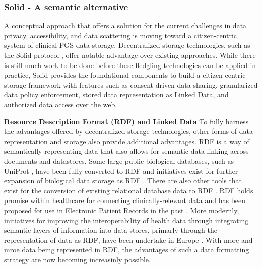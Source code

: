 \documentclass[runningheads]{llncs}
\begin{document}
\subsubsection{Solid - A semantic alternative} 
A conceptual approach that offers a solution for the current challenges in data privacy, accessibility, and data scattering is moving toward a citizen-centric system of clinical PGS data storage. 
Decentralized storage technologies, such as the Solid protocol \cite{capadisli_solid_nodate}, offer notable advantage over existing approaches. 
While there is still much work to be done before these fledgling technologies can be applied in practice, Solid provides the foundational components to build a citizen-centric storage framework with features such as consent-driven data sharing, granularized data policy enforcement, stored data representation as Linked Data, and authorized data access over the web.

\textbf{Resource Description Format (RDF) and Linked Data}
To fully harness the advantages offered by decentralized storage technologies, other forms of data representation and storage also provide additional advantages.
RDF is a way of semantically representing data that also allows for semantic data linking across documents and datastores.
Some large public biological databases, such as UniProt \cite{theuniprotconsortium_uniprot_2017}, have been fully converted to RDF and initiatives exist for further expansion of biological data storage as RDF \cite{sib_swiss_institute_of_bioinformatics_rdf_group_members_sib_2024}.
There are also other tools that exist for the conversion of existing relational database data to RDF \cite{jupp_ebi_2014}.
RDF holds promise within healthcare for connecting clinically-relevant data and has been proposed for use in Electronic Patient Records in the past \cite{lindemann_resource_2008}.
More modernly, initiatives for improving the interoperability of health data through integrating semantic layers of information into data stores, primarly through the representation of data as RDF, have been undertake in Europe \cite{van_der_horst_bridging_2023}.
With more and mroe data being represented in RDF, the advantages of such a data formatting strategy are now becoming increasinly possible.
\end{document}
